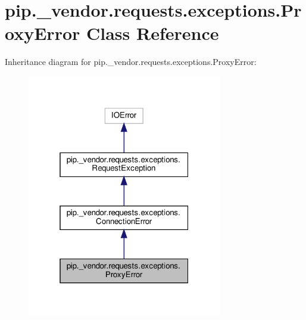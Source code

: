 \hypertarget{classpip_1_1__vendor_1_1requests_1_1exceptions_1_1ProxyError}{}\section{pip.\+\_\+vendor.\+requests.\+exceptions.\+Proxy\+Error Class Reference}
\label{classpip_1_1__vendor_1_1requests_1_1exceptions_1_1ProxyError}


Inheritance diagram for pip.\+\_\+vendor.\+requests.\+exceptions.\+Proxy\+Error\+:
\nopagebreak
\begin{figure}[H]
\begin{center}
\leavevmode
\includegraphics[width=241pt]{classpip_1_1__vendor_1_1requests_1_1exceptions_1_1ProxyError__inherit__graph}
\end{center}
\end{figure}


